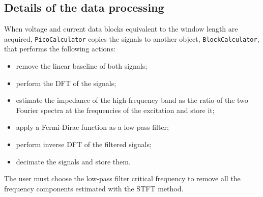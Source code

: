 \subsection{Details of the data processing}

When voltage and current data blocks equivalent to the window length are acquired, \verb|PicoCalculator| copies the signals to another object, \verb|BlockCalculator|, that performs the following actions:
\begin{itemize}
    \item remove the linear baseline of both signals;
    \item perform the DFT of the signals;
    \item estimate the impedance of the high-frequency band as the ratio of the two Fourier spectra at the frequencies of the excitation and store it;
    \item apply a Fermi-Dirac function as a low-pass filter;
    \item perform inverse DFT of the filtered signals;
    \item decimate the signals and store them.
\end{itemize}
The user must choose the low-pass filter critical frequency to remove all the frequency components estimated with the STFT method. 



